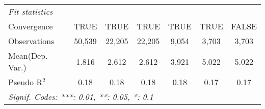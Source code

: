 \begin{tabular}{lcccccc}
   \midrule
   \emph{Fit statistics}\\
   Convergence             &TRUE     & TRUE    & TRUE    & TRUE        & TRUE    & FALSE\\  
   Observations            & 50,539  & 22,205  & 22,205  & 9,054       & 3,703   & 3,703\\  
Mean(Dep. Var.) & 1.816 & 2.612 & 2.612 & 3.921 & 5.022 & 5.022 \\
   Pseudo R$^2$            & 0.18    & 0.18    & 0.18    & 0.18        & 0.17    & 0.17\\  
   \midrule \midrule
   \multicolumn{7}{l}{\emph{Signif. Codes: ***: 0.01, **: 0.05, *: 0.1}}\\
\end{tabular}
\par\endgroup
